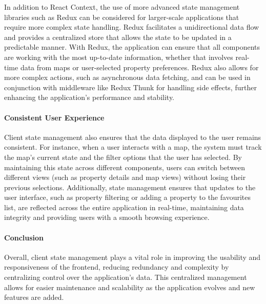 In addition to React Context, the use of more advanced state management
libraries such as Redux can be considered for larger{-}scale applications
that require more complex state handling. Redux facilitates a unidirectional
data flow and provides a centralized store that allows the state to be
updated in a predictable manner. With Redux, the application can ensure that
all components are working with the most up{-}to{-}date information, whether
that involves real{-}time data from maps or user{-}selected property
preferences. Redux also allows for more complex actions, such as
asynchronous data fetching, and can be used in conjunction with middleware
like Redux Thunk for handling side effects, further enhancing the
application's performance and stability. \paragraph{Consistent User
Experience}\mbox{}

Client state management also ensures that the data displayed to the user
remains consistent. For instance, when a user interacts with a map, the
system must track the map's current state and the filter options that the
user has selected. By maintaining this state across different components,
users can switch between different views (such as property details and map
views) without losing their previous selections. Additionally, state
management ensures that updates to the user interface, such as property
filtering or adding a property to the favourites list, are reflected across
the entire application in real{-}time, maintaining data integrity and
providing users with a smooth browsing experience.
\paragraph{Conclusion}\mbox{}

Overall, client state management plays a vital role in improving the
usability and responsiveness of the frontend, reducing redundancy and
complexity by centralizing control over the application's data. This
centralized management allows for easier maintenance and scalability as the
application evolves and new features are added.

\newpage{}

